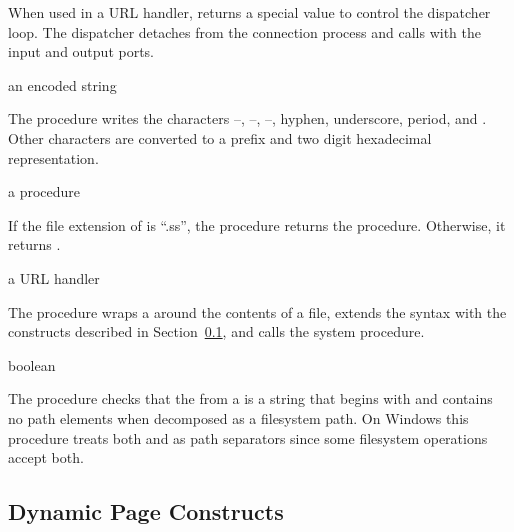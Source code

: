 When used in a URL handler,  returns a
special value to control the dispatcher loop. The dispatcher detaches
from the connection process and calls  with the input and
output ports.

\begin{procedure}
\end{procedure}
\returns{} an encoded string

The  procedure writes the characters
--, --,
--, hyphen, underscore, period, and
\code{\~}. Other characters are converted to a \code{\%} prefix
and two digit hexadecimal representation.

\begin{procedure}
\end{procedure}
\returns{} a procedure \alt{} 

If the file extension of  is ``.ss'', the
 procedure returns the
 procedure. Otherwise, it returns
.

\begin{procedure}
\end{procedure}
\returns{} a URL handler

The  procedure wraps a
 around the contents of a file, extends the
syntax with the constructs described in
Section~\ref{sec:dynamic-page-constructs}, and calls the 
system procedure.

\begin{procedure}
\end{procedure}
\returns{} boolean

The  procedure checks that the  from a  is a string that begins with \code{/} and contains no  path elements when decomposed as a filesystem path.
On Windows this procedure treats both \code{/} and \code{\textbackslash}
as path separators since some filesystem operations accept both.

\subsection {Dynamic Page Constructs}\label{sec:dynamic-page-constructs}

